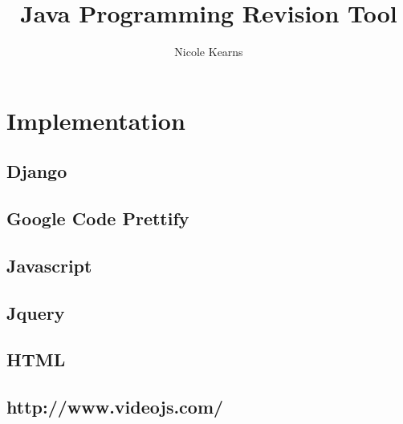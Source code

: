 \documentclass{article}
\begin{document}
\title{Java Programming Revision Tool}
\author{Nicole Kearns}
\maketitle
\tableofcontents

\newpage

\section{Implementation}

\subsection{Django}

\subsection{Google Code Prettify}

\subsection{Javascript}

\subsection{Jquery}

\subsection{HTML}

\subsection{http://www.videojs.com/}
\end{document}

